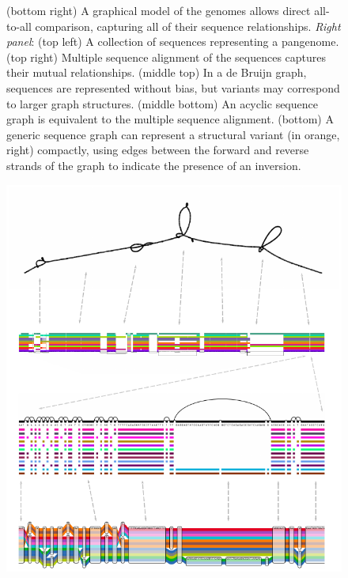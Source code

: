 \begin{figure}[p]
{    (bottom right) A graphical model of the genomes allows direct all-to-all comparison, capturing all of their sequence relationships.
    \emph{Right panel}:
    (top left) A collection of sequences representing a pangenome.
    (top right) Multiple sequence alignment of the sequences captures their mutual relationships.
    (middle top) In a de Bruijn graph, sequences are represented without bias, but variants may correspond to larger graph structures.
    (middle bottom) An acyclic sequence graph is equivalent to the multiple sequence alignment.
    (bottom) A generic sequence graph can represent a structural variant (in orange, right) compactly, using edges between the forward and reverse strands of the graph to indicate the presence of an inversion.
  }
\end{figure}

\begin{figure}[p]
  \begin{minipage}[c]{0.67\textwidth}
    \includegraphics[width=\textwidth]{figures/fig2viz.pdf}
  \end{minipage}\hfill
  \begin{minipage}[c]{0.3\textwidth}
    \caption{
}
\end{minipage}
\end{figure}
